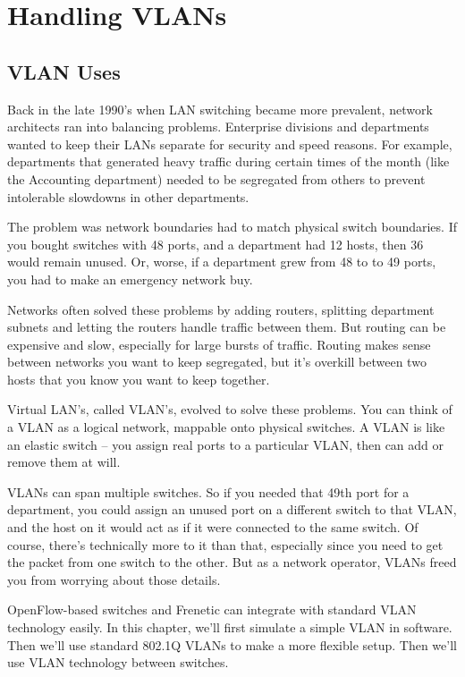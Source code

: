 
\chapter{Handling VLANs}

\section{VLAN Uses}
\label{handling_vlans:uses}

Back in the late 1990's when LAN switching became more prevalent, network architects ran into balancing problems.
Enterprise divisions and departments wanted to keep their 
LANs separate for security and speed reasons.  For example, departments that generated heavy traffic 
during certain times of the month (like the Accounting department) needed to be segregated from others
to prevent intolerable slowdowns in other departments.  

The problem was network boundaries had to match physical switch boundaries.  If you bought switches with
48 ports, and a department had 12 hosts, then 36 would remain unused.  Or, worse, if a department grew from 
48 to to 49 ports, you had to make an emergency network buy.  

Networks often solved these problems by adding routers, splitting department subnets and letting the 
routers handle traffic between them.  But routing can be expensive and slow, especially for large 
bursts of traffic.  Routing makes sense between networks you want to keep segregated, but it's
overkill between two hosts that you know you want to keep together.

Virtual LAN's, called VLAN's, evolved to solve these problems.  You can think of a VLAN as a logical 
network, mappable onto physical switches.  A VLAN is like an elastic switch -- you assign real ports to 
a particular VLAN, then can add or remove them at will.  

VLANs can span multiple switches.  So if you needed that 49th port for a department, you could assign 
an unused port on a different switch to that VLAN, and the host on it would act as if it were connected to 
the same switch.  Of course, there's technically more to it than that, especially since you need to get the
packet from one switch to the other.  But as a network operator, VLANs freed you from worrying about
those details.  

OpenFlow-based switches and Frenetic can integrate with standard VLAN technology easily.  In this 
chapter, we'll first simulate a simple VLAN in software.  Then we'll use standard 802.1Q VLANs to 
make a more flexible setup.  Then we'll use VLAN technology between switches.  

